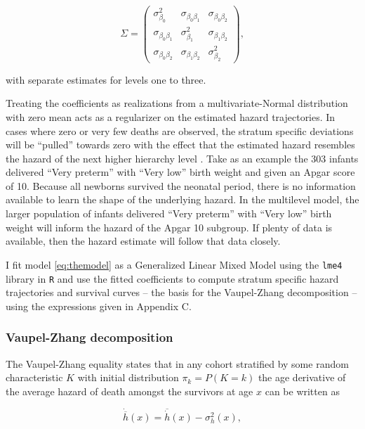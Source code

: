 \documentclass[10pt,twoside,reqno]{article}
\begin{document}
\[
\Sigma = \begin{pmatrix}
    \sigma^2_{\beta_0} & \sigma_{\beta_0\beta_1} & \sigma_{\beta_0\beta_2} \\
    \sigma_{\beta_0\beta_1} & \sigma^2_{\beta_1} & \sigma_{\beta_1\beta_2} \\
    \sigma_{\beta_0\beta_2} & \sigma_{\beta_1\beta_2} & \sigma^2_{\beta_2}
    \end{pmatrix},
\]

with separate estimates for levels one to three.

Treating the coefficients as realizations from a multivariate-Normal distribution with zero mean acts as a regularizer on the estimated hazard trajectories. In cases where zero or very few deaths are observed, the stratum specific deviations will be ``pulled'' towards zero with the effect that the estimated hazard resembles the hazard of the next higher hierarchy level \citep{Gelman2007}. Take as an example the 303 infants delivered ``Very preterm'' with ``Very low'' birth weight and given an Apgar score of 10. Because all newborns survived the neonatal period, there is no information available to learn the shape of the underlying hazard. In the multilevel model, the larger population of infants delivered ``Very preterm'' with ``Very low'' birth weight will inform the hazard of the Apgar 10 subgroup. If plenty of data is available, then the hazard estimate will follow that data closely.

I fit model \eqref{eq:themodel} as a Generalized Linear Mixed Model using the \texttt{lme4} library in \texttt{R} \citep{Bates2015} and use the fitted coefficients to compute stratum specific hazard trajectories and survival curves -- the basis for the Vaupel-Zhang decomposition -- using the expressions given in Appendix C.

\subsubsection*{Vaupel-Zhang decomposition}\label{vaupel-zhang-decomposition}

The Vaupel-Zhang equality \citep{Vaupel2010a} states that in any cohort stratified by some random characteristic \(K\) with initial distribution \(\pi_k = P(K=k)\) the age derivative of the average hazard of death amongst the survivors at age \(x\) can be written as

\[
  \dot{\overline{h}}(x) = \overline{\dot{h}}(x) - \sigma^2_h(x),
\]
\end{document}
